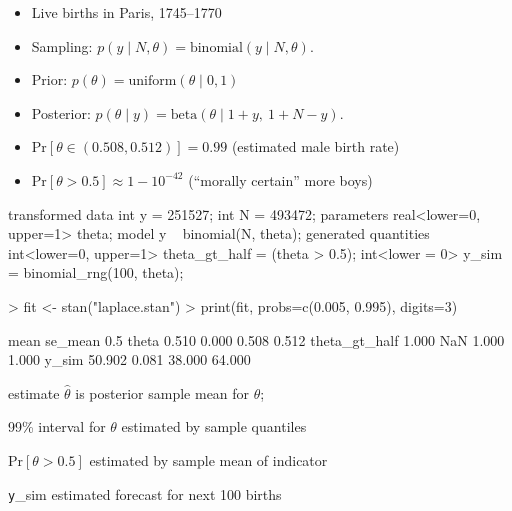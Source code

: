 \documentclass[11pt]{report}
\begin{document}

\begin{itemize}
\item Live births in Paris, 1745--1770
\item Sampling:
$p(y \mid N, \theta)
 = \textrm{binomial}(y \mid N, \theta).$
\item Prior:
$p(\theta)
 = \textrm{uniform}(\theta \mid 0, 1)$
\item Posterior:
$p(\theta \mid y)
 = \textrm{beta}(\theta \mid 1 + y, \ 1 + N - y).$
\item {\small $\textrm{Pr}[\theta \in (0.508, 0.512)] = 0.99$}
\hfill {\footnotesize (estimated male birth rate)}
\item {\small $\textrm{Pr}[\theta > 0.5] \approx 1 - 10^{-42}$}
\hfill {\footnotesize (``morally certain'' more boys)}
\end{itemize}

\begin{stancode}
transformed data {
  int y = 251527;  int N = 493472;
}
parameters {
  real<lower=0, upper=1> theta;
}
model {
  y ~ binomial(N, theta);
}
generated quantities {
  int<lower=0, upper=1> theta_gt_half = (theta > 0.5);
  int<lower = 0> y_sim = binomial_rng(100, theta);
}
\end{stancode}

%
\begin{codein}
> fit <- stan("laplace.stan")
> print(fit, probs=c(0.005, 0.995), digits=3)
\end{codein}
\begin{codeout}
                     mean se_mean   0.5%
theta               0.510   0.000  0.508   0.512
theta_gt_half       1.000     NaN  1.000   1.000
y_sim              50.902   0.081 38.000  64.000
\end{codeout}
%
\begin{subitemize}
\item estimate $\hat{\theta}$ is posterior sample mean for $\theta$;
\item 99\% interval for $\theta$ estimated by sample quantiles
\item $\textrm{Pr}[\theta > 0.5]$ estimated by sample mean of indicator
\item {\texttt y\_sim} estimated forecast for next 100 births
\end{subitemize}
\end{document}
